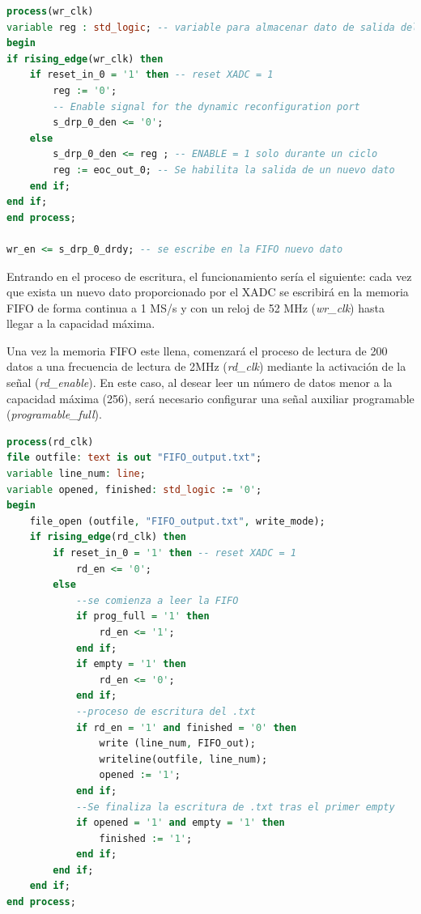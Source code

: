 \vspace{5mm}

\begin{lstlisting}[language=VHDL, style=mystyle, caption={Proceso de escritura}]
process(wr_clk) 
variable reg : std_logic; -- variable para almacenar dato de salida del xadc
begin
if rising_edge(wr_clk) then
    if reset_in_0 = '1' then -- reset XADC = 1
        reg := '0';
        -- Enable signal for the dynamic reconfiguration port
        s_drp_0_den <= '0'; 
    else
        s_drp_0_den <= reg ; -- ENABLE = 1 solo durante un ciclo
        reg := eoc_out_0; -- Se habilita la salida de un nuevo dato 
    end if;
end if;
end process; 

wr_en <= s_drp_0_drdy; -- se escribe en la FIFO nuevo dato 
\end{lstlisting}

\vspace{3mm}

\pagebreak

Entrando en el proceso de escritura, el funcionamiento sería el siguiente: cada vez que exista un nuevo dato proporcionado por el XADC se escribirá en la memoria FIFO de forma continua a 1 MS/s y con un reloj de 52 MHz (\textit{wr\_clk}) hasta llegar a la capacidad máxima.

Una vez la memoria FIFO este llena, comenzará el proceso de lectura de 200 datos a una frecuencia de lectura de 2MHz (\textit{rd\_clk}) mediante la activación de la señal (\textit{rd\_enable}). En este caso, al desear leer un número de datos menor a la capacidad máxima (256), será necesario configurar una señal auxiliar programable (\textit{programable\_full}).

\vspace{5mm}

\begin{lstlisting}[language=VHDL, style=mystyle, caption={Proceso de lectura}]
process(rd_clk) 
file outfile: text is out "FIFO_output.txt"; 
variable line_num: line;
variable opened, finished: std_logic := '0'; 
begin
    file_open (outfile, "FIFO_output.txt", write_mode); 
    if rising_edge(rd_clk) then
        if reset_in_0 = '1' then -- reset XADC = 1
            rd_en <= '0';
        else
            --se comienza a leer la FIFO 
            if prog_full = '1' then 
                rd_en <= '1';
            end if; 
            if empty = '1' then  
                rd_en <= '0';
            end if;
            --proceso de escritura del .txt
            if rd_en = '1' and finished = '0' then 
                write (line_num, FIFO_out);
                writeline(outfile, line_num);
                opened := '1';
            end if;
            --Se finaliza la escritura de .txt tras el primer empty
            if opened = '1' and empty = '1' then 
                finished := '1';
            end if;
        end if;
    end if;
end process;   
\end{lstlisting}

